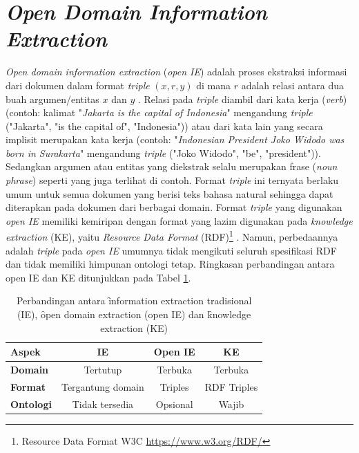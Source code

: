 \section{\textit{Open Domain Information Extraction}}

\textit{Open domain information extraction} (\textit{open IE}) adalah proses ekstraksi informasi dari dokumen dalam format \textit{triple} $(x, r, y)$ di mana $r$ adalah relasi antara dua buah argumen/entitas $x$ dan $y$ \citep{banko2007open, etzioni2011open}. Relasi pada \textit{triple} diambil dari kata kerja (\textit{verb}) \citep{banko2007open, fader2011identifying} (contoh: kalimat "\textit{Jakarta is the capital of Indonesia}" mengandung \textit{triple} ("Jakarta", "is the capital of", "Indonesia")) atau dari kata lain yang secara implisit merupakan kata kerja \citep{schmitz2012open} (contoh: "\textit{Indonesian President Joko Widodo was born in Surakarta}" mengandung \textit{triple} ("Joko Widodo", "be", "president")). Sedangkan argumen atau entitas yang diekstrak selalu merupakan frase (\textit{noun phrase}) seperti yang juga terlihat di contoh. Format \textit{triple} ini ternyata berlaku umum untuk semua dokumen yang berisi teks bahasa natural sehingga dapat diterapkan pada dokumen dari berbagai domain. Format \textit{triple} yang digunakan \textit{open IE} memiliki kemiripan dengan format yang lazim digunakan pada \textit{knowledge extraction} (KE), yaitu \textit{Resource Data Format} (RDF)\footnote{Resource Data Format W3C \url{https://www.w3.org/RDF/}} \citep{auer2007dbpedia, exner2014refractive}. Namun, perbedaannya adalah \textit{triple} pada \textit{open IE} umumnya tidak mengikuti seluruh spesifikasi RDF dan tidak memiliki himpunan ontologi tetap. Ringkasan perbandingan antara open IE dan KE ditunjukkan pada Tabel \ref{table_paradigm_comparison}. 

\begin{table}
	\centering
	\caption{Perbandingan antara \f{information extraction} tradisional (IE), \f{open domain extraction} (open IE) dan \f{knowledge extraction} (KE)}
	\label{table_paradigm_comparison}
	\begin{tabular}{l c c c}
		\hline 
		\textbf{Aspek} & \textbf{IE} & \textbf{Open IE} & \textbf{KE} \\ 
		\hline 
		\textbf{Domain} & Tertutup & Terbuka & Terbuka \\ 
		\textbf{Format} & Tergantung domain & Triples & RDF Triples \\ 
		\textbf{Ontologi} & Tidak tersedia & Opsional & Wajib \\ 
		\hline 
	\end{tabular} 
\end{table}

